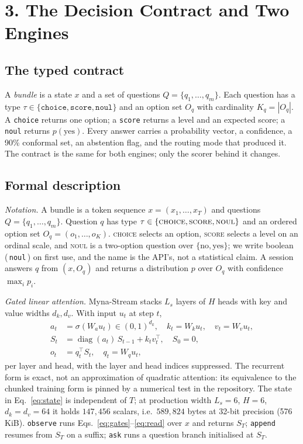 \documentclass[11pt]{article}
\begin{document}
\section*{3. The Decision Contract and Two Engines}
\subsection{The typed contract}
A \emph{bundle} is a state $x$ and a set of questions $Q=\{q_1,\dots,q_m\}$. Each question has a
type $\tau\in\{\texttt{choice},\texttt{score},\texttt{noul}\}$ and an option set $O_q$ with
cardinality $K_q=|O_q|$. A \texttt{choice} returns one option; a \texttt{score} returns a level
and an expected score; a \texttt{noul} returns $p(\text{yes})$. Every answer carries a probability
vector, a confidence, a 90\% conformal set, an abstention flag, and the routing mode that produced
it. The contract is the same for both engines; only the scorer behind it changes.

\subsection{Formal description}

\emph{Notation.} A bundle is a token sequence $x=(x_1,\dots,x_T)$ and questions
$Q=\{q_1,\dots,q_m\}$. Question $q$ has type $\tau\in\{\textsc{choice},\textsc{score},
\textsc{noul}\}$ and an ordered option set $O_q=(o_1,\dots,o_K)$. \textsc{choice} selects an
option, \textsc{score} selects a level on an ordinal scale, and \textsc{noul} is a two-option
question over $\{\text{no},\text{yes}\}$; we write boolean (\,\texttt{noul}\,) on first use, and the
name is the API's, not a statistical claim. A session answers $q$ from $(x,O_q)$ and returns a
distribution $p$ over $O_q$ with confidence $\max_i p_i$.

\emph{Gated linear attention.} Myna-Stream{} stacks $L_s$ layers of $H$ heads with key and value
widths $d_k,d_v$. With input $u_t$ at step $t$,
\begin{align}
a_t &= \sigma(W_a u_t)\in(0,1)^{d_k},\quad k_t=W_k u_t,\quad v_t=W_v u_t, \\
S_t &= \operatorname{diag}(a_t)\,S_{t-1} + k_t v_t^{\top},\quad S_0=0, \\
o_t &= q_t^{\top} S_t,\quad q_t=W_q u_t, \end{align}
per layer and head, with the layer and head indices suppressed. The recurrent form is exact, not an
approximation of quadratic attention: its equivalence to the chunked training form is pinned by a
numerical test in the repository. The state in Eq.~\eqref{eq:state} is independent of $T$; at
production width $L_s=6$, $H=6$, $d_k=d_v=64$ it holds $147{,}456$ scalars, i.e.\ $589{,}824$ bytes
at 32-bit precision (576\,KiB). \texttt{observe} runs Eqs.~\eqref{eq:gates}--\eqref{eq:read} over
$x$ and returns $S_T$; \texttt{append} resumes from $S_T$ on a suffix; \texttt{ask} runs a question
branch initialised at $S_T$.
\end{document}
